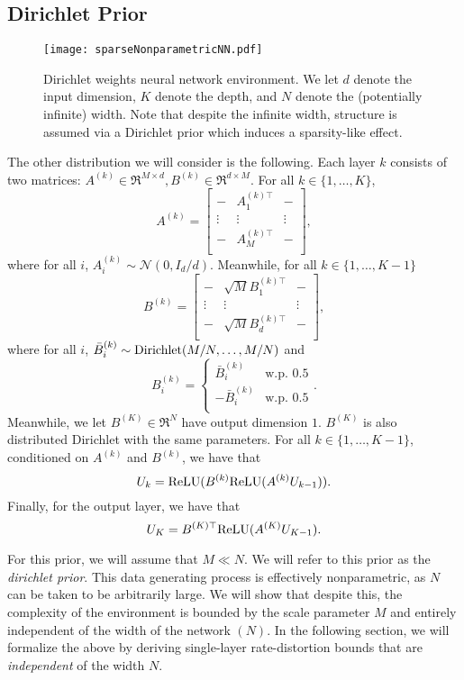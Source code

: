 \documentclass[twoside,11pt]{article}
\def\normal{\mathcal{N}}
\def\relu{{\rm ReLU}}
\begin{document}
\subsection{Dirichlet Prior}
\label{subsec:sparse-nonparametric-prior}
\begin{figure}[!ht]
    \centering
    \texttt{[image: sparseNonparametricNN.pdf]}
    \caption{Dirichlet weights neural network environment. We let $d$ denote the input dimension, $K$ denote the depth, and $N$ denote the (potentially infinite) width. Note that despite the infinite width, structure is assumed via a Dirichlet prior which induces a sparsity-like effect.}
    \label{fig:proto_env2}
\end{figure}
The other distribution we will consider is the following.
Each layer $k$ consists of two matrices: $A^{(k)}\in\Re^{M\times d}, B^{(k)}\in\Re^{d\times M}$.
For all $k \in \{1, \ldots, K\}$, 
$$
    A^{(k)} =
    \begin{bmatrix}
        - & A_1^{(k)\top} & -\\
        \vdots & \vdots & \vdots\\
        - & A_M^{(k)\top} & -\\
    \end{bmatrix},
$$
where for all $i$, $A_i^{(k)}\sim\normal(0, I_d/d)$. Meanwhile, for all $k \in \{1, \ldots, K-1\}$
$$
    B^{(k)} =
    \begin{bmatrix}
        - & \sqrt{M}B_1^{(k)\top} & -\\
        \vdots & \vdots & \vdots\\
        - & \sqrt{M}B_d^{(k)\top} & -\\
    \end{bmatrix},
$$
where for all $i$, $\bar{B}_i^{(k)} \sim {\rm Dirichlet}(M/N, \ldots, M/N)$ and
$$B_{i}^{(k)} = 
    \begin{cases}
        \bar{B}_{i}^{(k)} & \text{w.p. } 0.5\\
        -\bar{B}_{i}^{(k)} & \text{w.p. } 0.5\\
    \end{cases}.
$$
Meanwhile, we let $B^{(K)} \in \Re^{N}$ have output dimension $1$. $B^{(K)}$ is also distributed Dirichlet with the same parameters. For all $k \in \{1, \ldots, K-1\}$, conditioned on $A^{(k)}$ and $B^{(k)}$, we have that
$$U_{k} = \relu(B^{(k)}\relu(A^{(k)}U_{k-1})).$$
Finally, for the output layer, we have that
$$U_{K} = B^{(K)\top}\relu(A^{(K)}U_{K-1}).$$

For this prior, we will assume that $M \ll N$. We will refer to this prior as the \emph{dirichlet prior}. This data generating process is effectively nonparametric, as $N$ can be taken to be arbitrarily large. We will show that despite this, the complexity of the environment is bounded by the scale parameter $M$ and entirely independent of the width of the network $(N)$. In the following section, we will formalize the above by deriving single-layer rate-distortion bounds that are \emph{independent} of the width $N$.
\end{document}
